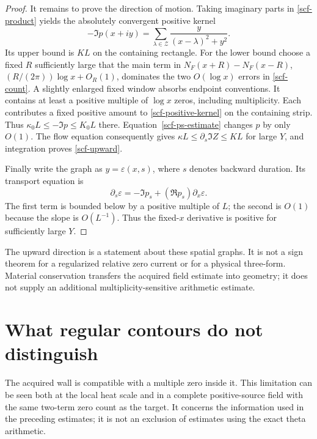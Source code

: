 \documentclass[11pt]{article}
\theoremstyle{remark}
\begin{document}
\begin{proof}
It remains to prove the direction of motion.  Taking imaginary parts in
\eqref{scf-product} yields the absolutely convergent positive kernel
\begin{equation}\label{scf-positive-kernel}
 -\Im p(x+iy)=\sum_{\lambda\in\mathcal Z}
                   \frac{y}{(x-\lambda)^2+y^2}.
\end{equation}
Its upper bound is $KL$ on the containing rectangle.
For the lower bound choose a fixed $R$ sufficiently large that the main
term in $N_F(x+R)-N_F(x-R)$,
$(R/(2\pi))\log x+O_R(1)$, dominates the two
$O(\log x)$ errors in \eqref{scf-count}.  A slightly enlarged fixed
window absorbs endpoint conventions.  It contains at least a positive
multiple of $\log x$ zeros, including multiplicity.  Each contributes a
fixed positive amount to \eqref{scf-positive-kernel} on the containing
strip.  Thus $\kappa_0L\le-\Im p\le K_0L$ there.
Equation~\eqref{scf-ps-estimate} changes $p$ by only $O(1)$.
The flow equation consequently gives
$\kappa L\le\partial_s\Im Z\le KL$ for large $Y$, and integration
proves \eqref{scf-upward}.

Finally write the graph as $y=\varepsilon(x,s)$, where $s$ denotes
backward duration.  Its transport equation is
\[
 \partial_s\varepsilon=-\Im p_s
                   +(\Re p_s)\partial_x\varepsilon.
\]
The first term is bounded below by a positive multiple of $L$; the
second is $O(1)$ because the slope is $O(L^{-1})$.
Thus the fixed-$x$ derivative is positive for sufficiently large $Y$.
\end{proof}

The upward direction is a statement about these spatial graphs.  It is
not a sign theorem for a regularized relative zero current or for a
physical three-form.  Material conservation transfers the acquired
field estimate into geometry; it does not supply an additional
multiplicity-sensitive arithmetic estimate.

\section{What regular contours do not distinguish}
\label{sec:limits}

The acquired wall is compatible with a multiple zero inside it. This
limitation can be seen both at the local heat scale and in a complete
positive-source field with the same two-term zero count as the target.
It concerns the information used in the preceding estimates; it is not
an exclusion of estimates using the exact theta arithmetic.
\end{document}
